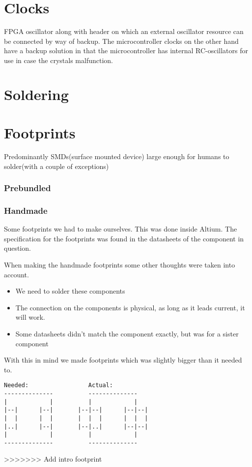 \section{Clocks}
FPGA oscillator along with header on which an external oscillator resource can be connected by way of backup.
The microcontroller clocks on the other hand have a backup solution in that the microcontroller has internal RC-oscillators for use in case the crystals malfunction.

\section{Soldering}



\section{Footprints}
Predominantly SMDs(surface mounted device) large enough for humans to solder(with a couple of exceptions)




\subsubsection{Prebundled}

\subsubsection{Handmade}
Some footprints we had to make ourselves.
This was done inside Altium.
The specification for the footprints was found in the datasheets of the component in question.

When making the handmade footprints some other thoughts were taken into account.

\begin{itemize}
    \item We need to solder these components
    \item The connection on the components is physical, as long as it leads current, it will work.
    \item Some datasheets didn't match the component exactly, but was for a sister component
\end{itemize}

With this in mind we made footprints which was slightly bigger than it needed to.

\begin{verbatim}
Needed:                 Actual:
--------------          --------------
|            |          |            |
|--|      |--|       |--|--|      |--|--|
|  |      |  |       |  |  |      |  |  |
|..|      |--|       |--|..|      |--|--|
|            |          |            |
--------------          --------------
\end{verbatim}
>>>>>>> Add intro footprint

